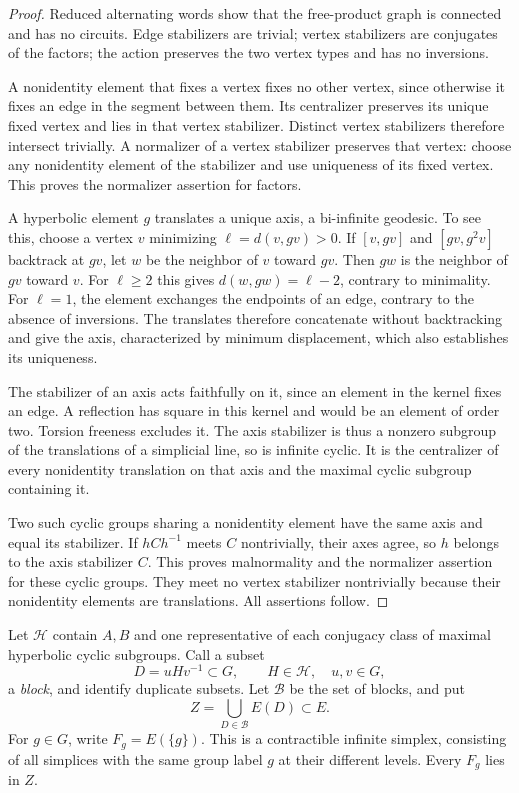 \documentclass[11pt]{article}
\theoremstyle{remark}
\begin{document}
\begin{proof}
Reduced alternating words show that the free-product graph is
connected and has no circuits. Edge stabilizers are trivial; vertex
stabilizers are conjugates of the factors; the action preserves the
two vertex types and has no inversions.

A nonidentity element that fixes a vertex fixes no other vertex,
since otherwise it fixes an edge in the segment between them.
Its centralizer preserves its unique fixed vertex and lies in that
vertex stabilizer. Distinct vertex stabilizers therefore intersect
trivially. A normalizer of a vertex stabilizer preserves that vertex:
choose any nonidentity element of the stabilizer and use uniqueness
of its fixed vertex. This proves the normalizer assertion for factors.

A hyperbolic element \(g\) translates a unique axis, a bi-infinite geodesic.
To see this, choose a vertex \(v\) minimizing \(\ell=d(v,gv)>0\).
If \([v,gv]\) and \([gv,g^2v]\) backtrack at \(gv\), let \(w\) be the
neighbor of \(v\) toward \(gv\). Then \(gw\) is the neighbor of \(gv\)
toward \(v\). For \(\ell\geq2\) this gives \(d(w,gw)=\ell-2\), contrary
to minimality. For \(\ell=1\), the element exchanges the endpoints of
an edge, contrary to the absence of inversions. The translates therefore
concatenate without backtracking and give the axis, characterized by
minimum displacement, which also establishes its uniqueness.

The stabilizer of an axis acts faithfully on it, since an element in
the kernel fixes an edge. A reflection has square in this kernel and
would be an element of order two. Torsion freeness excludes it.
The axis stabilizer is thus a nonzero subgroup of the translations of
a simplicial line, so is infinite cyclic. It is the centralizer of
every nonidentity translation on that axis and the maximal cyclic
subgroup containing it.

Two such cyclic groups sharing a nonidentity element have the same
axis and equal its stabilizer. If \(hCh^{-1}\) meets \(C\) nontrivially,
their axes agree, so \(h\) belongs to the axis stabilizer \(C\).
This proves malnormality and the normalizer assertion for these
cyclic groups. They meet no vertex stabilizer nontrivially because
their nonidentity elements are translations. All assertions follow.
\end{proof}

Let \(\mathcal H\) contain \(A,B\) and one representative of each conjugacy
class of maximal hyperbolic cyclic subgroups. Call a subset
\[
 D=uHv^{-1}\subset G,\qquad H\in\mathcal H,\quad u,v\in G,
\]
a \emph{block}, and identify duplicate subsets. Let \(\mathcal B\) be the
set of blocks, and put
\[
 Z=\bigcup_{D\in\mathcal B}E(D)\subset E.
\]
For \(g\in G\), write \(F_g=E(\{g\})\). This is a contractible infinite
simplex, consisting of all simplices with the same group label \(g\)
at their different levels. Every \(F_g\) lies in \(Z\).
\end{document}
